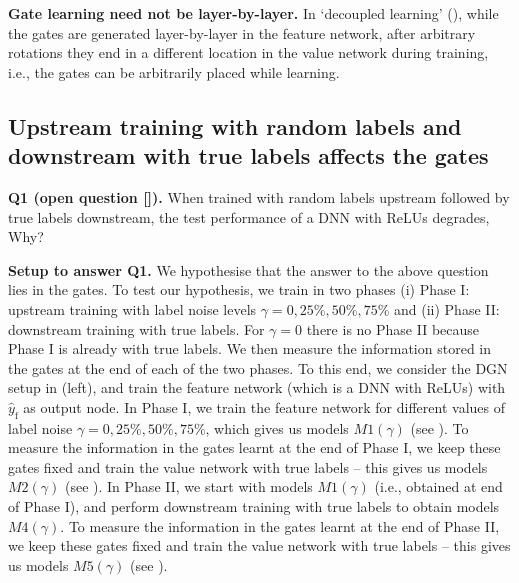 \textbf{Gate learning need not be layer-by-layer.} In `decoupled learning' (), while the gates are generated layer-by-layer in the feature network, after arbitrary rotations they end in a different location in the value network during training, i.e., the gates can be arbitrarily placed while learning.
\subsection{Upstream training with random labels and downstream with true labels affects the gates}\label{sec:exp2}
\textbf{Q1 (open question []).} {When trained with random labels upstream followed by true labels downstream, the test performance of a DNN with ReLUs degrades, Why?}

\textbf{Setup to answer Q1.} We hypothesise that the answer to the above question lies in the gates. To test our hypothesis, we train in two phases (i) Phase I: upstream training with label noise levels $\gamma=0, 25\%, 50\%, 75\%$ and (ii) Phase II: downstream training with true labels. For $\gamma=0$ there is no Phase II because Phase I is already with true labels. We then measure the information stored in the gates at the end of each of the two phases. To this end, we consider the DGN setup in  (left), and train the feature network (which is a DNN with ReLUs) with $\hat{y}_{\text{f}}$ as output node. In Phase I, we train the feature network for different values of label noise $\gamma=0, 25\%, 50\%, 75\%$, which gives us models $M1(\gamma)$ (see ). To measure the information in the gates learnt at the end of Phase I, we keep these gates fixed and train the value network with true labels -- this gives us models $M2(\gamma)$ (see ). In Phase II, we start with models $M1(\gamma)$ (i.e., obtained at end of Phase I), and perform downstream training with true labels to obtain models $M4(\gamma)$.  To measure the information in the gates learnt at the end of Phase II, we keep these gates fixed and train the value network with true labels -- this gives us models $M5(\gamma)$ (see ).

